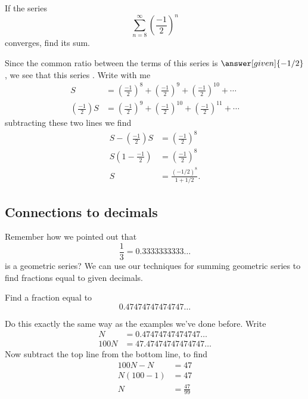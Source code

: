 \documentclass{ximera}
\begin{document}
\begin{example}
If the series 
\[
\sum_{n=8}^\infty \left(\frac{-1}{2}\right)^n
\]
converges, find its sum.
\begin{explanation}
  Since the common ratio between the terms of this series is
$\answer[given]{-1/2}$, we see that this series
. Write with me
\begin{align*}
  S &= \left(\frac{-1}{2}\right)^{8} + \left(\frac{-1}{2}\right)^{9} + \left(\frac{-1}{2}\right)^{10} + \cdots\\
  \left(\frac{-1}{2}\right) S &= \left(\frac{-1}{2}\right)^{9} + \left(\frac{-1}{2}\right)^{10} + \left(\frac{-1}{2}\right)^{11} + \cdots
\end{align*}
subtracting these two lines we find
\begin{align*}
  S -  \left(\frac{-1}{2}\right) S  &= \left(\frac{-1}{2}\right)^{8}\\
  S\left(1-\frac{-1}{2}\right) &= \left(\frac{-1}{2}\right)^{8}\\
  S &= \frac{(-1/2)^{8}}{1+1/2}.
\end{align*}
\end{explanation}
\end{example}


\subsection{Connections to decimals}

Remember how we pointed out that 
\[
\frac{1}{3} = 0.3333333333\dots
\]
is a geometric series? We can use our techniques for summing geometric
series to find fractions equal to given decimals.

\begin{example}
  Find a fraction equal to
  \[
  0.47474747474747\dots
  \]
  \begin{explanation}
    Do this exactly the same way as the examples we've done
    before. Write
    \begin{align*}
    N &=      0.47474747474747\dots\\
    100 N &= 47.47474747474747\dots
    \end{align*}
    Now subtract the top line from the bottom line, to find
    \begin{align*}
      100N - N &= 47\\
      N(100-1) &= 47\\
      N &= \frac{47}{99}
    \end{align*}
  \end{explanation}
\end{example}
\end{document}
